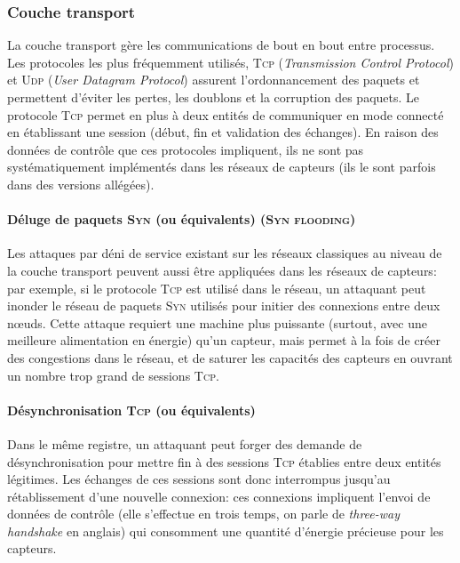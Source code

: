     \subsubsection{Couche transport}
La couche transport gère les communications de bout en bout entre processus.
Les protocoles les plus fréquemment utilisés, \textsc{Tcp} (\textit{Transmission Control Protocol}) et \textsc{Udp} (\textit{User Datagram Protocol}) assurent l'ordonnancement des paquets et permettent d'éviter les pertes, les doublons et la corruption des paquets.
Le protocole \textsc{Tcp} permet en plus à deux entités de communiquer en mode connecté en établissant une session (début, fin et validation des échanges).
En raison des données de contrôle que ces protocoles impliquent, ils ne sont pas systématiquement implémentés dans les réseaux de capteurs (ils le sont parfois dans des versions allégées).

        \paragraph{Déluge de paquets \textsc{Syn} (ou équivalents) (\textsc{Syn flooding})}
Les attaques par déni de service existant sur les réseaux classiques au niveau de la couche transport peuvent aussi être appliquées dans les réseaux de capteurs: par exemple, si le protocole \textsc{Tcp} est utilisé dans le réseau, un attaquant peut inonder le réseau de paquets \textsc{Syn} utilisés pour initier des connexions entre deux nœuds.
Cette attaque requiert une machine plus puissante (surtout, avec une meilleure alimentation en énergie) qu'un capteur, mais permet à la fois de créer des congestions dans le réseau, et de saturer les capacités des capteurs en ouvrant un nombre trop grand de sessions \textsc{Tcp}.

        \paragraph{Désynchronisation \textsc{Tcp} (ou équivalents)}
Dans le même registre, un attaquant peut forger des demande de désynchronisation pour mettre fin à des sessions \textsc{Tcp} établies entre deux entités légitimes.
Les échanges de ces sessions sont donc interrompus jusqu'au rétablissement d'une nouvelle connexion: ces connexions impliquent l'envoi de données de contrôle (elle s'effectue en trois temps, on parle de \textit{three-way handshake} en anglais) qui consomment une quantité d'énergie précieuse pour les capteurs.


